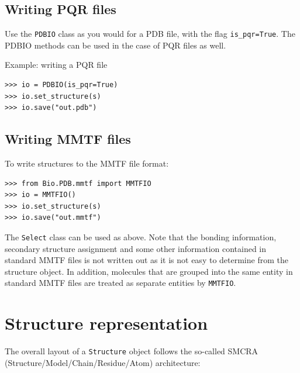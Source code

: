 \subsection{Writing PQR files}

Use the \texttt{PDBIO} class as you would for a PDB file, with the flag \texttt{is\_pqr=True}.
The PDBIO methods can be used in the case of PQR files as well.

Example: writing a PQR file

\begin{verbatim}
>>> io = PDBIO(is_pqr=True)
>>> io.set_structure(s)
>>> io.save("out.pdb")
\end{verbatim}

\subsection{Writing MMTF files}

To write structures to the MMTF file format:

\begin{verbatim}
>>> from Bio.PDB.mmtf import MMTFIO
>>> io = MMTFIO()
>>> io.set_structure(s)
>>> io.save("out.mmtf")
\end{verbatim}

The \texttt{Select} class can be used as above. Note that the bonding
information, secondary structure assignment and some other information contained
in standard MMTF files is not written out as it is not easy to determine from
the structure object. In addition, molecules that are grouped into the same
entity in standard MMTF files are treated as separate entities by
\texttt{MMTFIO}.


\section{Structure representation}

The overall layout of a \texttt{Structure} object follows the so-called SMCRA
(Structure/Model/Chain/Residue/Atom) architecture:

